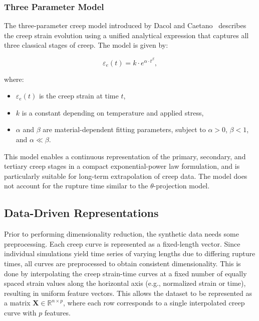 \documentclass[class=scrbook, crop=false]{standalone}
\begin{document}
	\subsubsection{Three Parameter Model}
	\label{Subsubsection::Three_parameter_model}
	
	The three-parameter creep model introduced by Dacol and Caetano~\cite{dacol2022modelling} describes the creep strain evolution using a unified analytical expression that captures all three classical stages of creep. The model is given by:
	
	\begin{equation}
	\varepsilon_e(t) = k \cdot e^{\alpha \cdot t^{\beta}},
	\label{eq:three_stage_creep_equation}
	\end{equation}
	
	where:
	\begin{itemize}
		\item \( \varepsilon_e(t) \) is the creep strain at time \( t \),
		\item \( k \) is a constant depending on temperature and applied stress,
		\item \( \alpha \) and \( \beta \) are material-dependent fitting parameters, subject to \( \alpha > 0 \), \( \beta < 1 \), and \( \alpha \ll \beta \).
	\end{itemize}
	
	This model enables a continuous representation of the primary, secondary, and tertiary creep stages in a compact exponential-power law formulation, and is particularly suitable for long-term extrapolation of creep data. The model does not account for the rupture time similar to the $\theta$-projection model.

	
	\subsection{Data-Driven Representations}
	
	Prior to performing dimensionality reduction, the synthetic data needs some preprocessing. Each creep curve is represented as a fixed-length vector. Since individual simulations yield time series of varying lengths due to differing rupture times, all curves are preprocessed to obtain consistent dimensionality. This is done by interpolating the creep strain-time curves at a fixed number of equally spaced strain values along the horizontal axis (e.g., normalized strain or time), resulting in uniform feature vectors. This allows the dataset to be represented as a matrix $\mathbf{X} \in \mathbb{R}^{n \times p}$, where each row corresponds to a single interpolated creep curve with $p$ features.
	
\end{document}
